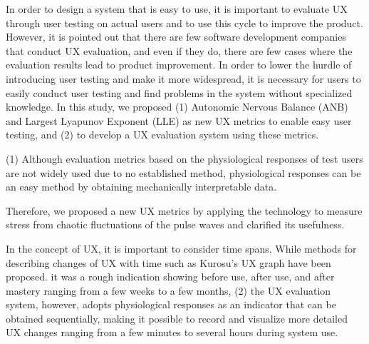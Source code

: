 \begin{eabstract}

In order to design a system that is easy to use, it is important to evaluate UX through user testing on actual users and to use this cycle to improve the product. However, it is pointed out that there are few software development companies that conduct UX evaluation, and even if they do, there are few cases where the evaluation results lead to product improvement. In order to lower the hurdle of introducing user testing and make it more widespread, it is necessary for users to easily conduct user testing and find problems in the system without specialized knowledge. In this study, we proposed (1) Autonomic Nervous Balance (ANB) and Largest Lyapunov Exponent (LLE) as new UX metrics to enable easy user testing, and  (2) to develop a UX evaluation system using these metrics.

(1) Although evaluation metrics based on the physiological responses of test users are not widely used due to no established method, physiological responses can be an easy method by obtaining mechanically interpretable data. 

Therefore, we proposed a new UX metrics by applying the technology to measure stress from chaotic fluctuations of the pulse waves and clarified its usefulness.

In the concept of UX, it is important to consider time spans. While methods for describing changes of UX with time such as Kurosu's UX graph have been proposed. it was a rough indication showing before use, after use, and after mastery ranging from a few weeks to a few months,  (2) the UX evaluation system, however, adopts physiological responses as an indicator that can be obtained sequentially, making it possible to record and visualize more detailed UX changes ranging from a few minutes to several hours during system use.


\end{eabstract}
